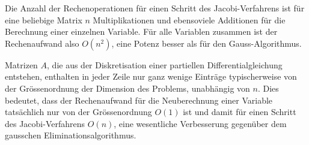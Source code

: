Die Anzahl der Rechenoperationen für einen Schritt des Jacobi-Verfahrens
ist für eine beliebige Matrix $n$ Multiplikationen und ebensoviele
Additionen für die Berechnung einer einzelnen Variable.
Für alle Variablen zusammen ist der Rechenaufwand also $O(n^2)$,
eine Potenz besser als für den Gauss-Algorithmus.

Matrizen $A$, die aus der Diskretisation einer partiellen
Differentialgleichung entstehen, enthalten in jeder Zeile nur ganz
wenige Einträge typischerweise von der Grössenordnung der
Dimension des Problems, unabhängig von $n$.
Dies bedeutet, dass der Rechenaufwand für die Neuberechnung
einer Variable tatsächlich nur von der Grössenordnung $O(1)$ ist
und damit für einen Schritt des Jacobi-Verfahrens $O(n)$, eine
wesentliche Verbesserung gegenüber dem gausschen Eliminationsalgorithmus.

%
%
